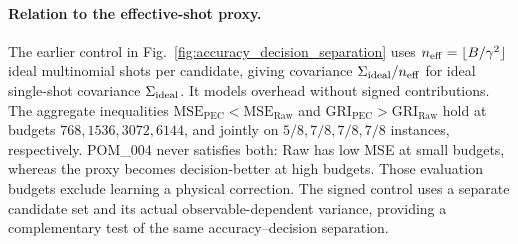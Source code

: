 \documentclass[a4paper,onecolumn,unpublished,nopdfoutputerror]{quantumarticle}
\theoremstyle{plain}
\theoremstyle{definition}
\newcommand{\MSE}{\mathrm{MSE}}
\newcommand{\Raw}{\mathrm{Raw}}
\newcommand{\PEC}{\mathrm{PEC}}
\newcommand{\GRI}{\mathrm{GRI}}
\newcommand{\1}{\mathbf{1}}
\begin{document}
\paragraph{Relation to the effective-shot proxy.}
The earlier control in Fig.~\ref{fig:accuracy_decision_separation} uses $n_{\rm eff}=\lfloor B/\gamma^2\rfloor$ ideal multinomial shots per candidate, giving covariance $\Sigma_{\rm ideal}/n_{\rm eff}$ for ideal single-shot covariance $\Sigma_{\rm ideal}$. It models overhead without signed contributions. The aggregate inequalities $\MSE_{\PEC}<\MSE_{\Raw}$ and $\GRI_{\PEC}>\GRI_{\Raw}$ hold at budgets $768,1536,3072,6144$, and jointly on $5/8,7/8,7/8,7/8$ instances, respectively. POM\_004 never satisfies both: Raw has low MSE at small budgets, whereas the proxy becomes decision-better at high budgets. Those evaluation budgets exclude learning a physical correction. The signed control uses a separate candidate set and its actual observable-dependent variance, providing a complementary test of the same accuracy--decision separation.
\end{document}
